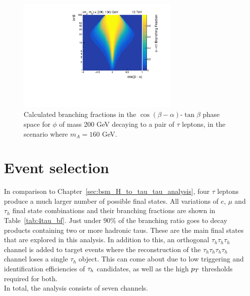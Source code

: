 \begin{figure}[!hbtp]
\centering
    \includegraphics[width=0.7\textwidth]{Figures/phi_branching_fractions_mphi200_mA160.pdf}
\caption[Plot of the branching fractions of $\phi$ to pairs of $\tau$ leptons out of the alignment scenario.]{Calculated branching fractions in the $\cos(\beta-\alpha)$-$\tan\beta$ phase space for $\phi$ of mass 200 GeV decaying to a pair of $\tau$ leptons, in the scenario where $m_A = 160$ GeV.}
\label{fig:4tau_br_2d}
\end{figure}

\section{Event selection}

In comparison to Chapter~\ref{sec:bsm_H_to_tau_tau_analysis}, four $\tau$ leptons produce a much larger number of possible final states. 
All variations of $e$, $\mu$ and $\tau_h$ final state combinations and their branching fractions are shown in Table~\ref{tab:4tau_bf}.
Just under 90\% of the branching ratio goes to decay products containing two or more hadronic taus.
These are the main final states that are explored in this analysis. 
In addition to this, an orthogonal $\tau_h \tau_h \tau_h$ channel is added to target events where the reconstruction of the $\tau_h \tau_h \tau_h \tau_h$ channel loses a single $\tau_h$ object.
This can come about due to low triggering and identification efficiencies of $\tau_{h}$ candidates, as well as the high $p_{T}$ thresholds required for both. \\
In total, the analysis consists of seven channels.

